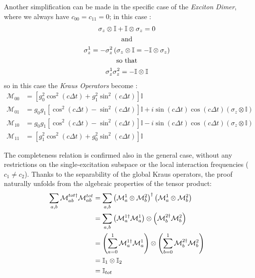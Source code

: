 \documentclass[a4paper,12pt]{article}
\begin{document}
Another simplification can be made in the specific case of the \textit{Exciton Dimer}, where we always have $ c_{00} = c_{11} = 0 $; in this case :
\begin{gather}
	\sigma_z \otimes \mathbb{I} + \mathbb{I} \otimes \sigma_z = 0 \notag \\
	\text{and} \notag \\
	\sigma_{z}^{1} = - \sigma_{z}^{2} \left( \sigma_{z} \otimes \mathbb{I} = - \mathbb{I} \otimes \sigma_z  \right) \notag \\
	\text{so that} \notag \\
	\sigma_{z}^{1} \sigma_{z}^{2} = - \mathbb{I} \otimes \mathbb{I} \notag
\end{gather}
so in this case the \textit{Kraus Operators} become : 
\begin{align}
	\mathcal{M}_{00} &= \left[ g_0^2 \cos^2(c \Delta t) + g_1^2 \sin^2(c \Delta t) \right] \mathbb{I} \\
	\mathcal{M}_{01} &= g_0 g_1 \left[ \cos^2(c \Delta t) - \sin^2(c \Delta t) \right] \mathbb{I} + i \sin(c \Delta t) \cos(c \Delta t) (\sigma_z \otimes \mathbb{I}) \\
	\mathcal{M}_{10} &= g_0 g_1 \left[ \cos^2(c \Delta t) - \sin^2(c \Delta t) \right] \mathbb{I} - i \sin(c \Delta t) \cos(c \Delta t) (\sigma_z \otimes \mathbb{I}) \\
	\mathcal{M}_{11} &= \left[ g_1^2 \cos^2(c \Delta t) + g_0^2 \sin^2(c \Delta t) \right] \mathbb{I}
\end{align}

The completeness relation is confirmed also in the general case, without any restrictions on the single-excitation subspace or the local interaction frequencies ($c_1 \neq c_2$). Thanks to the separability of the global Kraus operators, the proof naturally unfolds from the algebraic properties of the tensor product:
\begin{align}
	\sum_{a,b} \mathcal{M}_{ab}^{tot \dagger} \mathcal{M}_{ab}^{tot} &= \sum_{a,b} \left( \mathcal{M}_a^{1} \otimes \mathcal{M}_b^{2} \right)^\dagger \left( \mathcal{M}_a^{1} \otimes \mathcal{M}_b^{2} \right) \notag \\
	&= \sum_{a,b} \left( \mathcal{M}_a^{1 \dagger} \mathcal{M}_a^{1} \right) \otimes \left( \mathcal{M}_b^{2 \dagger} \mathcal{M}_b^{2} \right) \notag \\
	&= \left( \sum_{a=0}^{1} \mathcal{M}_a^{1 \dagger} \mathcal{M}_a^{1} \right) \otimes \left( \sum_{b=0}^{1} \mathcal{M}_b^{2 \dagger} \mathcal{M}_b^{2} \right) \notag \\
	&= \mathbb{I}_1 \otimes \mathbb{I}_2 \notag \\
	&= \mathbb{I}_{tot}
\end{align}
\end{document}
